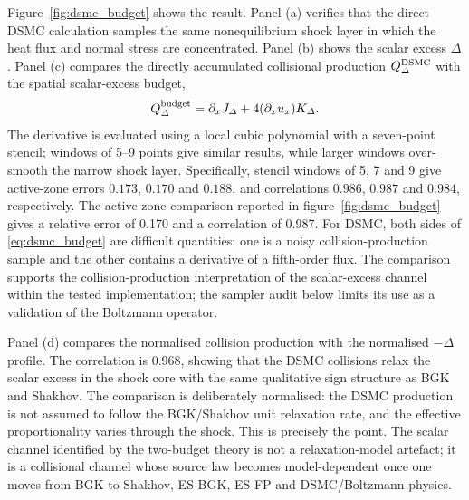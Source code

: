 \documentclass[lineno,paper]{JFM-FLM_Au}
\newenvironment{revision}{\begingroup\colorlet{shadecolor}{revisionyellow}\begin{shaded}}{\end{shaded}\endgroup}
\newenvironment{revision}{}{}
\begin{document}
\begin{revision}
Figure~\ref{fig:dsmc_budget} shows the result.  Panel (a) verifies that the direct DSMC calculation samples the same nonequilibrium shock layer in which the heat flux and normal stress are concentrated.  Panel (b) shows the scalar excess $\Delta$.  Panel (c) compares the directly accumulated collisional production $Q_\Delta^{\rm DSMC}$ with the spatial scalar-excess budget,
\begin{equation}
  Q_\Delta^{\rm budget}=\partial_xJ_\Delta+4(\partial_xu_x)K_\Delta .
  \label{eq:dsmc_budget}
\end{equation}
The derivative is evaluated using a local cubic polynomial with a seven-point stencil; windows of 5--9 points give similar results, while larger windows over-smooth the narrow shock layer.  Specifically, stencil windows of 5, 7 and 9 give active-zone errors $0.173$, $0.170$ and $0.188$, and correlations $0.986$, $0.987$ and $0.984$, respectively.  The active-zone comparison reported in figure~\ref{fig:dsmc_budget} gives a relative error of 0.170 and a correlation of 0.987.  For DSMC, both sides of \eqref{eq:dsmc_budget} are difficult quantities: one is a noisy collision-production sample and the other contains a derivative of a fifth-order flux.  The comparison supports the collision-production interpretation of the scalar-excess channel within the tested implementation; the sampler audit below limits its use as a validation of the Boltzmann operator.
\end{revision}

Panel (d) compares the normalised collision production with the normalised $-\Delta$ profile.  The correlation is 0.968, showing that the DSMC collisions relax the scalar excess in the shock core with the same qualitative sign structure as BGK and Shakhov.  The comparison is deliberately normalised: the DSMC production is not assumed to follow the BGK/Shakhov unit relaxation rate, and the effective proportionality varies through the shock.  This is precisely the point.  The scalar channel identified by the two-budget theory is not a relaxation-model artefact; it is a collisional channel whose source law becomes model-dependent once one moves from BGK to Shakhov, ES-BGK, ES-FP and DSMC/Boltzmann physics.
\end{document}
